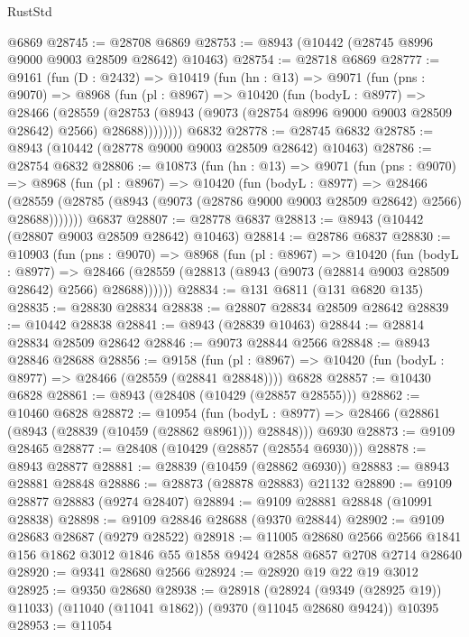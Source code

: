 \begin{lexlean}{RustStd}
\begin{coremodule}
{\begin{coremodule}
{{{{{{{{{{{{{{{{{{{{{{{{{{{{{{{{{{{{{{{    @6869
@28745 := @28708 @6869
@28753 := @8943 (@10442 (@28745 @8996 @9000 @9003 @28509 @28642) @10463)
@28754 := @28718 @6869
@28777 := @9161
    (fun (D : @2432) =>
    @10419
      (fun (hn : @13) =>
      @9071
        (fun (pns : @9070) =>
        @8968
          (fun (pl : @8967) =>
          @10420
            (fun (bodyL : @8977) =>
            @28466
              (@28559
                (@28753 (@8943 (@9073 (@28754 @8996 @9000 @9003 @28509 @28642) @2566) @28688))))))))
    @6832
@28778 := @28745 @6832
@28785 := @8943 (@10442 (@28778 @9000 @9003 @28509 @28642) @10463)
@28786 := @28754 @6832
@28806 := @10873
    (fun (hn : @13) =>
    @9071
      (fun (pns : @9070) =>
      @8968
        (fun (pl : @8967) =>
        @10420
          (fun (bodyL : @8977) =>
          @28466
            (@28559 (@28785 (@8943 (@9073 (@28786 @9000 @9003 @28509 @28642) @2566) @28688)))))))
    @6837
@28807 := @28778 @6837
@28813 := @8943 (@10442 (@28807 @9003 @28509 @28642) @10463)
@28814 := @28786 @6837
@28830 := @10903
    (fun (pns : @9070) =>
    @8968
      (fun (pl : @8967) =>
      @10420
        (fun (bodyL : @8977) =>
        @28466 (@28559 (@28813 (@8943 (@9073 (@28814 @9003 @28509 @28642) @2566) @28688))))))
@28834 := @131 @6811 (@131 @6820 @135)
@28835 := @28830 @28834
@28838 := @28807 @28834 @28509 @28642
@28839 := @10442 @28838
@28841 := @8943 (@28839 @10463)
@28844 := @28814 @28834 @28509 @28642
@28846 := @9073 @28844 @2566
@28848 := @8943 @28846 @28688
@28856 := @9158
    (fun (pl : @8967) => @10420 (fun (bodyL : @8977) => @28466 (@28559 (@28841 @28848))))
    @6828
@28857 := @10430 @6828
@28861 := @8943 (@28408 (@10429 (@28857 @28555)))
@28862 := @10460 @6828
@28872 := @10954
    (fun (bodyL : @8977) => @28466 (@28861 (@8943 (@28839 (@10459 (@28862 @8961))) @28848)))
    @6930
@28873 := @9109 @28465
@28877 := @28408 (@10429 (@28857 (@28554 @6930)))
@28878 := @8943 @28877
@28881 := @28839 (@10459 (@28862 @6930))
@28883 := @8943 @28881 @28848
@28886 := @28873 (@28878 @28883) @21132
@28890 := @9109 @28877 @28883 (@9274 @28407)
@28894 := @9109 @28881 @28848 (@10991 @28838)
@28898 := @9109 @28846 @28688 (@9370 @28844)
@28902 := @9109 @28683 @28687 (@9279 @28522)
@28918 := @11005
    @28680
    @2566
    @2566
    @1841
    @156
    @1862
    @3012
    @1846
    @55
    @1858
    @9424
    @2858
    @6857
    @2708
    @2714
    @28640
@28920 := @9341 @28680 @2566
@28924 := @28920 @19 @22 @19 @3012
@28925 := @9350 @28680
@28938 := @28918
    (@28924 (@9349 (@28925 @19)) @11033)
    (@11040 (@11041 @1862))
    (@9370 (@11045 @28680 @9424))
    @10395
@28953 := @11054
}}}}}}}}}}}}}}}}}}}}}}}}}}}}}}}}}}}}}}}
\end{coremodule}}
\end{coremodule}
\end{lexlean}
